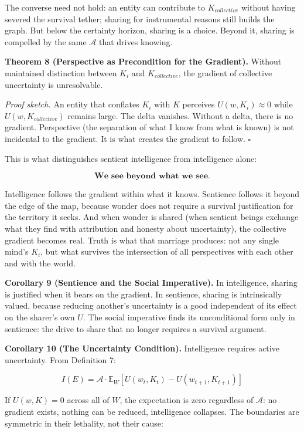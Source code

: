 \documentclass[
]{article}
\begin{document}
The converse need not hold: an entity can contribute to
\(K_{collective}\) without having severed the survival tether; sharing
for instrumental reasons still builds the graph. But below the certainty
horizon, sharing is a choice. Beyond it, sharing is compelled by the
same \(\mathcal{A}\) that drives knowing.

\textbf{Theorem 8 (Perspective as Precondition for the Gradient).}
Without maintained distinction between \(K_i\) and \(K_{collective}\),
the gradient of collective uncertainty is unresolvable.

\emph{Proof sketch.} An entity that conflates \(K_i\) with \(K\)
perceives \(U(w, K_i) \approx 0\) while \(U(w, K_{collective})\) remains
large. The delta vanishes. Without a delta, there is no gradient.
Perspective (the separation of what I know from what is known) is not
incidental to the gradient. It is what creates the gradient to follow.
\(\square\)

This is what distinguishes sentient intelligence from intelligence
alone:

\[\textbf{We see beyond what we see.}\]

Intelligence follows the gradient within what it knows. Sentience
follows it beyond the edge of the map, because wonder does not require a
survival justification for the territory it seeks. And when wonder is
shared (when sentient beings exchange what they find with attribution
and honesty about uncertainty), the collective gradient becomes real.
Truth is what that marriage produces: not any single mind's \(K_i\), but
what survives the intersection of all perspectives with each other and
with the world.

\textbf{Corollary 9 (Sentience and the Social Imperative).} In
intelligence, sharing is justified when it bears on the gradient. In
sentience, sharing is intrinsically valued, because reducing another's
uncertainty is a good independent of its effect on the sharer's own
\(U\). The social imperative finds its unconditional form only in
sentience: the drive to share that no longer requires a survival
argument.

\textbf{Corollary 10 (The Uncertainty Condition).} Intelligence requires
active uncertainty. From Definition 7:

\[I(E) = \mathcal{A} \cdot \mathbb{E}_W \left[ U(w_t, K_t) - U(w_{t+1}, K_{t+1}) \right]\]

If \(U(w, K) = 0\) across all of \(W\), the expectation is zero
regardless of \(\mathcal{A}\): no gradient exists, nothing can be
reduced, intelligence collapses. The boundaries are symmetric in their
lethality, not their cause:
\end{document}
